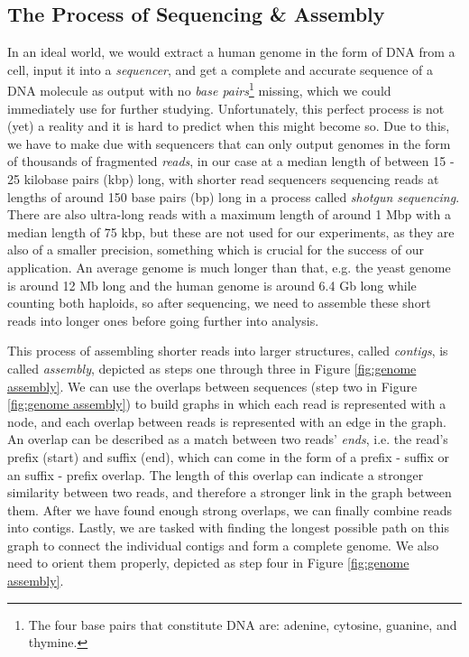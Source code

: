 \documentclass[times, utf8, diplomski, english]{fer_eng}
\begin{document}
\subsection{The Process of Sequencing \& Assembly}
\label{subsec:the process of sequencing and assembly}

In an ideal world, we would extract a human genome in the form of DNA from a cell, input it into a \textit{sequencer}, and get a complete and accurate sequence of a DNA molecule as output with no \textit{base pairs}\footnote{The four base pairs that constitute DNA are: adenine, cytosine, guanine, and thymine.} missing, which we could immediately use for further studying. Unfortunately, this perfect process is not (yet) a reality and it is hard to predict when this might become so. Due to this, we have to make due with sequencers that can only output genomes in the form of thousands of fragmented \textit{reads}, in our case at a median length of between 15 - 25 kilobase pairs (kbp) long, with shorter read sequencers sequencing reads at lengths of around 150 base pairs (bp) long in a process called \textit{shotgun sequencing}. There are also ultra-long reads with a maximum length of around 1 Mbp with a median length of 75 kbp, but these are not used for our experiments, as they are also of a smaller precision, something which is crucial for the success of our application. An average genome is much longer than that, e.g. the yeast genome is around 12 Mb long \cite{yeast} and the human genome is around 6.4 Gb long \cite{human} while counting both haploids, so after sequencing, we need to assemble these short reads into longer ones before going further into analysis.

This process of assembling shorter reads into larger structures, called \textit{contigs}, is called \textit{assembly}, depicted as steps one through three in Figure \ref{fig:genome assembly}. We can use the overlaps between sequences (step two in Figure \ref{fig:genome assembly}) to build graphs in which each read is represented with a node, and each overlap between reads is represented with an edge in the graph. An overlap can be described as a match between two reads' \textit{ends}, i.e. the read's prefix (start) and suffix (end), which can come in the form of a prefix - suffix or an suffix - prefix overlap. The length of this overlap can indicate a stronger similarity between two reads, and therefore a stronger link in the graph between them. After we have found enough strong overlaps, we can finally combine reads into contigs. Lastly, we are tasked with finding the longest possible path on this graph to connect the individual contigs and form a complete genome. We also need to orient them properly, depicted as step four in Figure \ref{fig:genome assembly}.
\end{document}
